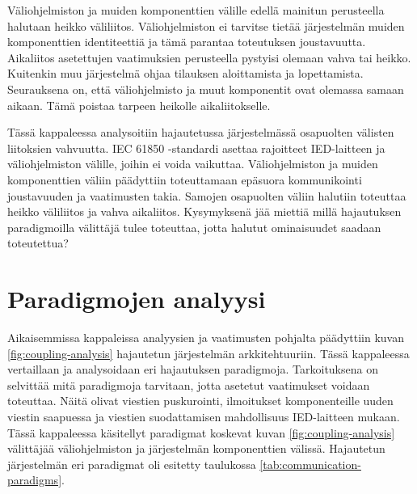 
Väliohjelmiston ja muiden komponenttien välille edellä mainitun perusteella halutaan heikko väliliitos. Väliohjelmiston ei tarvitse tietää järjestelmän muiden komponenttien identiteettiä ja tämä parantaa toteutuksen joustavuutta. Aikaliitos asetettujen vaatimuksien perusteella pystyisi olemaan vahva tai heikko. Kuitenkin muu järjestelmä ohjaa tilauksen aloittamista ja lopettamista. Seurauksena on, että väliohjelmisto ja muut komponentit ovat olemassa samaan aikaan. Tämä poistaa tarpeen heikolle aikaliitokselle.

Tässä kappaleessa analysoitiin hajautetussa järjestelmässä osapuolten välisten liitoksien vahvuutta. IEC 61850 -standardi asettaa rajoitteet IED-laitteen ja väliohjelmiston välille, joihin ei voida vaikuttaa. Väliohjelmiston ja muiden komponenttien väliin päädyttiin toteuttamaan epäsuora kommunikointi joustavuuden ja vaatimusten takia. Samojen osapuolten väliin halutiin toteuttaa heikko väliliitos ja vahva aikaliitos. Kysymyksenä jää miettiä millä hajautuksen paradigmoilla välittäjä tulee toteuttaa, jotta halutut ominaisuudet saadaan toteutettua?


\section{Paradigmojen analyysi}
Aikaisemmissa kappaleissa analyysien ja vaatimusten pohjalta päädyttiin kuvan \ref{fig:coupling-analysis} hajautetun järjestelmän arkkitehtuuriin. Tässä kappaleessa vertaillaan ja analysoidaan eri hajautuksen paradigmoja. Tarkoituksena on selvittää mitä paradigmoja tarvitaan, jotta asetetut vaatimukset voidaan toteuttaa. Näitä olivat viestien puskurointi, ilmoitukset komponenteille uuden viestin saapuessa ja viestien suodattamisen mahdollisuus IED-laitteen mukaan. Tässä kappaleessa käsitellyt paradigmat koskevat kuvan \ref{fig:coupling-analysis} välittäjää väliohjelmiston ja järjestelmän komponenttien välissä. Hajautetun järjestelmän eri paradigmat oli esitetty taulukossa \ref{tab:communication-paradigms}.

